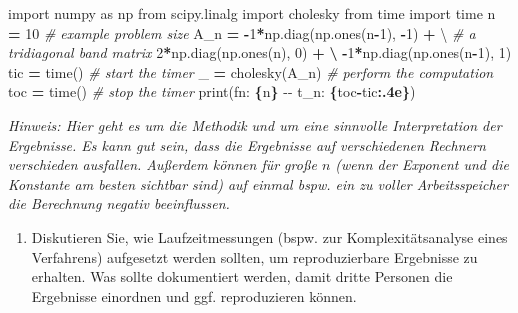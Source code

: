 \documentclass[
]{book}
\newenvironment{Shaded}{\begin{snugshade}}{\end{snugshade}}
\newcommand{\BuiltInTok}[1]{#1}
\newcommand{\CommentTok}[1]{\textcolor[rgb]{0.56,0.35,0.01}{\textit{#1}}}
\newcommand{\DecValTok}[1]{\textcolor[rgb]{0.00,0.00,0.81}{#1}}
\newcommand{\ImportTok}[1]{#1}
\newcommand{\NormalTok}[1]{#1}
\newcommand{\OperatorTok}[1]{\textcolor[rgb]{0.81,0.36,0.00}{\textbf{#1}}}
\newcommand{\SpecialCharTok}[1]{\textcolor[rgb]{0.81,0.36,0.00}{\textbf{#1}}}
\newcommand{\SpecialStringTok}[1]{\textcolor[rgb]{0.31,0.60,0.02}{#1}}
\providecommand{\tightlist}{%
  \setlength{\itemsep}{0pt}\setlength{\parskip}{0pt}}
\theoremstyle{definition}
\theoremstyle{definition}
\theoremstyle{definition}
\theoremstyle{definition}
\theoremstyle{remark}
\begin{document}
\begin{Shaded}
\begin{Highlighting}[]
\ImportTok{import}\NormalTok{ numpy }\ImportTok{as}\NormalTok{ np}
\ImportTok{from}\NormalTok{ scipy.linalg }\ImportTok{import}\NormalTok{ cholesky}
\ImportTok{from}\NormalTok{ time }\ImportTok{import}\NormalTok{ time}
\NormalTok{n }\OperatorTok{=} \DecValTok{10}                                  \CommentTok{\# example problem size}
\NormalTok{A\_n }\OperatorTok{=} \OperatorTok{{-}}\DecValTok{1}\OperatorTok{*}\NormalTok{np.diag(np.ones(n}\OperatorTok{{-}}\DecValTok{1}\NormalTok{), }\OperatorTok{{-}}\DecValTok{1}\NormalTok{) }\OperatorTok{+}\NormalTok{ \textbackslash{}  }\CommentTok{\# a tridiagonal band matrix}
    \DecValTok{2}\OperatorTok{*}\NormalTok{np.diag(np.ones(n), }\DecValTok{0}\NormalTok{) }\OperatorTok{+} \OperatorTok{\textbackslash{}}
    \OperatorTok{{-}}\DecValTok{1}\OperatorTok{*}\NormalTok{np.diag(np.ones(n}\OperatorTok{{-}}\DecValTok{1}\NormalTok{), }\DecValTok{1}\NormalTok{)}
\NormalTok{tic }\OperatorTok{=}\NormalTok{ time()                            }\CommentTok{\# start the timer}
\NormalTok{\_ }\OperatorTok{=}\NormalTok{ cholesky(A\_n)                       }\CommentTok{\# perform the computation}
\NormalTok{toc }\OperatorTok{=}\NormalTok{ time()                            }\CommentTok{\# stop the timer}
\BuiltInTok{print}\NormalTok{(}\SpecialStringTok{f\textquotesingle{}n: }\SpecialCharTok{\{}\NormalTok{n}\SpecialCharTok{\}}\SpecialStringTok{ {-}{-} t\_n: }\SpecialCharTok{\{}\NormalTok{toc}\OperatorTok{{-}}\NormalTok{tic}\SpecialCharTok{:.4e\}}\SpecialStringTok{\textquotesingle{}}\NormalTok{)}
\end{Highlighting}
\end{Shaded}

\emph{Hinweis: Hier geht es um die Methodik und um eine sinnvolle Interpretation der Ergebnisse. Es kann gut sein, dass die Ergebnisse auf verschiedenen Rechnern verschieden ausfallen. Außerdem können für große \(n\) (wenn der Exponent und die Konstante am besten sichtbar sind) auf einmal bspw. ein zu voller Arbeitsspeicher die Berechnung negativ beeinflussen.}

\begin{enumerate}
\def\labelenumi{\arabic{enumi}.}
\setcounter{enumi}{3}
\tightlist
\item
  Diskutieren Sie, wie Laufzeitmessungen (bspw. zur Komplexitätsanalyse eines Verfahrens) aufgesetzt werden sollten, um reproduzierbare Ergebnisse zu erhalten. Was sollte dokumentiert werden, damit dritte Personen die Ergebnisse einordnen und ggf. reproduzieren können.
\end{enumerate}
\end{document}
